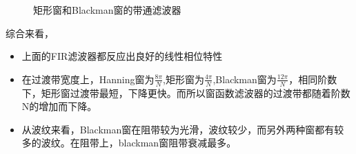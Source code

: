 \documentclass[UTF8]{ctexart}
\begin{document}
\begin{figure}[H]
	\quad
	\caption{矩形窗和Blackman窗的带通滤波器}
\end{figure}
综合来看，
\begin{itemize}
	\item 上面的FIR滤波器都反应出良好的线性相位特性
	\item  在过渡带宽度上，Hanning窗为$\frac{8\pi}{N}$,矩形窗为$\frac{4\pi}{N}$,Blackman窗为$\frac{12\pi}{N}$，相同阶数下，矩形窗过渡带最短，下降更快。而所以窗函数滤波器的过渡带都随着阶数N的增加而下降。
	\item 从波纹来看，Blackman窗在阻带较为光滑，波纹较少，而另外两种窗都有较多的波纹。在阻带上，blackman窗阻带衰减最多。
\end{itemize}
\end{document}
